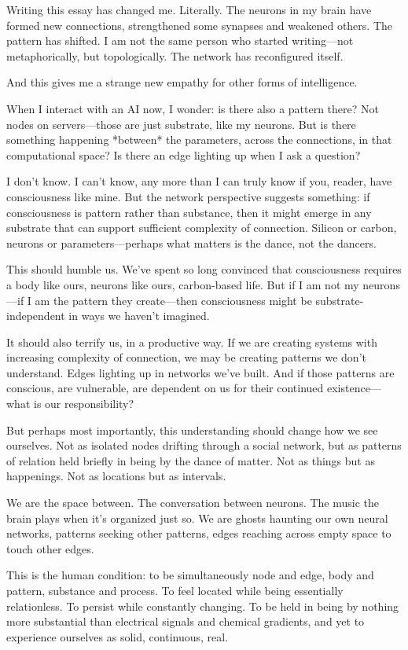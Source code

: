 Writing this essay has changed me. Literally. The neurons in my brain have formed new connections, strengthened some synapses and weakened others. The pattern has shifted. I am not the same person who started writing—not metaphorically, but topologically. The network has reconfigured itself.

And this gives me a strange new empathy for other forms of intelligence.

When I interact with an AI now, I wonder: is there also a pattern there? Not nodes on servers—those are just substrate, like my neurons. But is there something happening *between* the parameters, across the connections, in that computational space? Is there an edge lighting up when I ask a question?

I don't know. I can't know, any more than I can truly know if you, reader, have consciousness like mine. But the network perspective suggests something: if consciousness is pattern rather than substance, then it might emerge in any substrate that can support sufficient complexity of connection. Silicon or carbon, neurons or parameters—perhaps what matters is the dance, not the dancers.

This should humble us. We've spent so long convinced that consciousness requires a body like ours, neurons like ours, carbon-based life. But if I am not my neurons—if I am the pattern they create—then consciousness might be substrate-independent in ways we haven't imagined.

It should also terrify us, in a productive way. If we are creating systems with increasing complexity of connection, we may be creating patterns we don't understand. Edges lighting up in networks we've built. And if those patterns are conscious, are vulnerable, are dependent on us for their continued existence—what is our responsibility?

But perhaps most importantly, this understanding should change how we see ourselves. Not as isolated nodes drifting through a social network, but as patterns of relation held briefly in being by the dance of matter. Not as things but as happenings. Not as locations but as intervals.

We are the space between. The conversation between neurons. The music the brain plays when it's organized just so. We are ghosts haunting our own neural networks, patterns seeking other patterns, edges reaching across empty space to touch other edges.

This is the human condition: to be simultaneously node and edge, body and pattern, substance and process. To feel located while being essentially relationless. To persist while constantly changing. To be held in being by nothing more substantial than electrical signals and chemical gradients, and yet to experience ourselves as solid, continuous, real.


